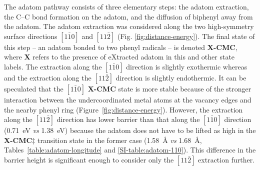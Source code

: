 \documentclass[journal=jacsat,manuscript=article]{achemso}
\newcommand{\lock}{\color{red}}
\newcommand{\lock}{\color{black}}
\begin{document}
{\lock

The adatom pathway consists of three elementary steps: the adatom extraction, the C--C bond formation on the adatom, and the diffusion of biphenyl away from the adatom. %
%
The adatom extraction was considered along the two high-symmetry surface directions $[1\bar{1}0]$ and $[11\bar{2}]$ (Fig. \ref{fig:distance-energy}). The final state of this step -- an adatom bonded to two phenyl radicals -- is denoted \textbf{X-CMC}, where \textbf{X} refers to the presence of eXtracted adatom in this and other state labels. 
%
The extraction along the $[1\bar{1}0]$ direction is slightly exothermic whereas and the extraction along the $[11\bar{2}]$ direction is slightly endothermic. It can be speculated that the $[1\bar{1}0]$ \textbf{X-CMC} state is more stable because of the stronger interaction between the undercoordinated metal atoms at the vacancy edges and the nearby phenyl ring (Figure~\ref{fig:distance-energy}).
%
%
However, the extraction along the $[11\bar{2}]$ direction has lower barrier than that along the $[1\bar{1}0]$ direction (\SI{0.71}{\electronvolt} \emph{vs} \SI{1.38}{\electronvolt}) because the adatom does not have to be lifted as high in the \textbf{X-CMC$\ddagger$} transition state in the former case (\SI{1.58}{\angstrom} \emph{vs} \SI{1.68}{\angstrom}, Tables~\ref{table:adatom-longitude} and \ref{SI-table:adatom-110}). This difference in the barrier height is significant enough to consider only the $[11\bar{2}]$ extraction further.

}
\end{document}
